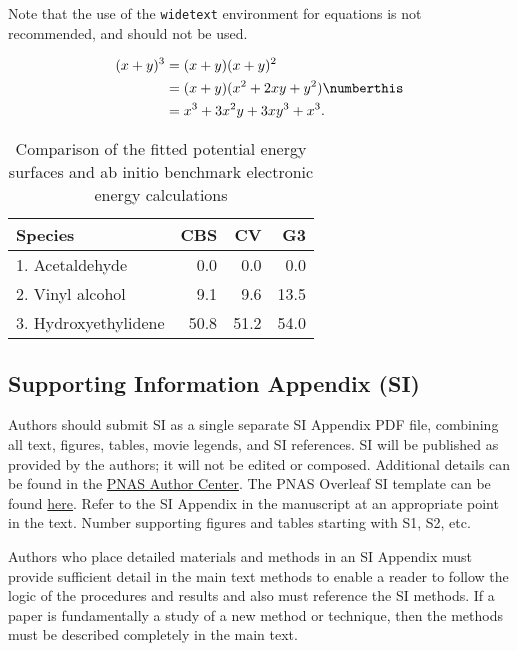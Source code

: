 \documentclass[9pt,twocolumn,twoside,lineno]{pnas-new}
\begin{document}
Note that the use of the \verb|widetext| environment for equations is not recommended, and should not be used. 

\begin{figure*}[bt!]
\begin{align*}
(x+y)^3&=(x+y)(x+y)^2\\
       &=(x+y)(x^2+2xy+y^2) \numberthis \label{eqn:example} \\
       &=x^3+3x^2y+3xy^3+x^3. 
\end{align*}
\end{figure*}


\begin{table}%
\centering
\caption{Comparison of the fitted potential energy surfaces and ab initio benchmark electronic energy calculations}
\begin{tabular}{lrrr}
Species & CBS & CV & G3 \\
\midrule
1. Acetaldehyde & 0.0 & 0.0 & 0.0 \\
2. Vinyl alcohol & 9.1 & 9.6 & 13.5 \\
3. Hydroxyethylidene & 50.8 & 51.2 & 54.0\\
\bottomrule
\end{tabular}

\end{table}

\subsection*{Supporting Information Appendix (SI)}

Authors should submit SI as a single separate SI Appendix PDF file, combining all text, figures, tables, movie legends, and SI references. SI will be published as provided by the authors; it will not be edited or composed. Additional details can be found in the \href{https://www.pnas.org/authors/submitting-your-manuscript#manuscript-formatting-guidelines}{PNAS Author Center}. The PNAS Overleaf SI template can be found \href{https://www.overleaf.com/latex/templates/pnas-template-for-supplementary-information/wqfsfqwyjtsd}{here}. Refer to the SI Appendix in the manuscript at an appropriate point in the text. Number supporting figures and tables starting with S1, S2, etc.

Authors who place detailed materials and methods in an SI Appendix must provide sufficient detail in the main text methods to enable a reader to follow the logic of the procedures and results and also must reference the SI methods. If a paper is fundamentally a study of a new method or technique, then the methods must be described completely in the main text.
\end{document}

